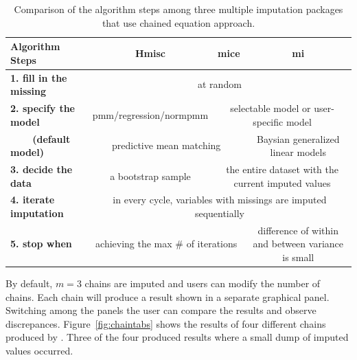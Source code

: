 \documentclass[article]{jss}
\begin{document}
\begin{center}
\begin{table}[h]
\begin{centering}
\begin{tabular}{l|c|c|c}
\hline 
\textbf{\scriptsize{Algorithm Steps}} & \textbf{\scriptsize{Hmisc}} & \textbf{\scriptsize{mice}} & \textbf{\scriptsize{mi}}\tabularnewline
\hline 
\textbf{\scriptsize{1. fill in the missing}} & \multicolumn{3}{c}{{\scriptsize{at random}}}\tabularnewline
\hline 
\textbf{\scriptsize{2. specify the model}} & {\scriptsize{pmm/regression/normpmm}} & \multicolumn{2}{c}{{\scriptsize{selectable model or user-specific model}}}\tabularnewline
\hline 
\textbf{\scriptsize{~~~~(default model)}} & \multicolumn{2}{c|}{{\scriptsize{predictive mean matching}}} & {\scriptsize{Baysian generalized linear models}}\tabularnewline
\hline 
\textbf{\scriptsize{3. decide the data}} & {\scriptsize{a bootstrap sample}} & \multicolumn{2}{c}{{\scriptsize{the entire dataset with the current imputed values}}}\tabularnewline
\hline 
\textbf{\scriptsize{4. iterate imputation}} & \multicolumn{3}{c}{{\scriptsize{in every cycle, variables with missings are imputed sequentially}}}\tabularnewline
\hline 
\textbf{\scriptsize{5. stop when}} & \multicolumn{2}{c|}{{\scriptsize{achieving the max \# of iterations}}} & {\scriptsize{difference of within and between variance is small}}\tabularnewline
\hline 
\end{tabular}
\par\end{centering}
\caption{Comparison of the algorithm steps among three multiple imputation packages that use chained equation approach.}
\label{tab:compare-mi}
\end{table}
\par\end{center}


By default, $m=3$ chains are imputed and users can modify the number of chains. Each chain will produce a result shown in a separate graphical panel. Switching among the panels the user can compare the results and observe discrepances. Figure~\ref{fig:chaintabs} shows the results of four different chains produced by . Three of the four produced results where a small dump of imputed values occurred.
\end{document}
